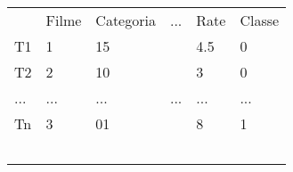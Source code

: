 \documentclass[10pt,a4paper]{article}
\begin{document}
\begin{table}[]
\centering

\label{my-label}
\begin{tabular}{llllll}
\cline{2-6}
\multicolumn{1}{l|}{}    & Filme & Categoria & ... & Rate & \multicolumn{1}{l|}{Classe} \\ \cline{2-6} 
\multicolumn{1}{l|}{T1}  & 1     & 15        &     & 4.5  & \multicolumn{1}{l|}{0}      \\
\multicolumn{1}{l|}{T2}  & 2     & 10        &     & 3    & \multicolumn{1}{l|}{0}      \\
\multicolumn{1}{l|}{...} & ...   & ...       & ... & ...  & \multicolumn{1}{l|}{...}    \\
\multicolumn{1}{l|}{Tn}  & 3     & 01        &     & 8    & \multicolumn{1}{l|}{1}      \\ \cline{2-6} 
                         &       &           &     &      &                             \\
                         &       &           &     &      &                             \\
                         &       &           &     &      &                             \\
                         &       &           &     &      &                             \\
                         &       &           &     &      &                            
\end{tabular}
\end{table}
\end{document}

